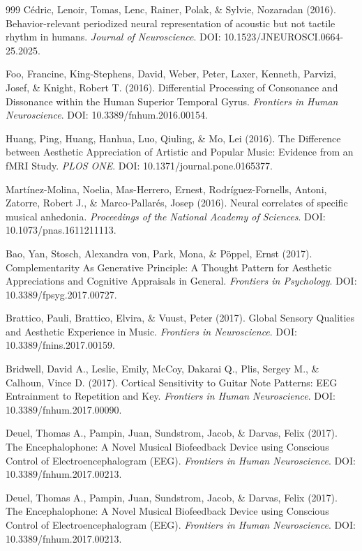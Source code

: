 \documentclass[9pt,onecolumn]{article}
\begin{document}
\begin{thebibliography}{999}
Cédric, Lenoir, Tomas, Lenc, Rainer, Polak, \& Sylvie, Nozaradan (2016). Behavior-relevant periodized neural representation of acoustic but not tactile rhythm in humans. \textit{Journal of Neuroscience}. DOI: 10.1523/JNEUROSCI.0664-25.2025.

Foo, Francine, King-Stephens, David, Weber, Peter, Laxer, Kenneth, Parvizi, Josef, \& Knight, Robert T. (2016). Differential Processing of Consonance and Dissonance within the Human Superior Temporal Gyrus. \textit{Frontiers in Human Neuroscience}. DOI: 10.3389/fnhum.2016.00154.

Huang, Ping, Huang, Hanhua, Luo, Qiuling, \& Mo, Lei (2016). The Difference between Aesthetic Appreciation of Artistic and Popular Music: Evidence from an fMRI Study. \textit{PLOS ONE}. DOI: 10.1371/journal.pone.0165377.

Martínez-Molina, Noelia, Mas-Herrero, Ernest, Rodríguez-Fornells, Antoni, Zatorre, Robert J., \& Marco-Pallarés, Josep (2016). Neural correlates of specific musical anhedonia. \textit{Proceedings of the National Academy of Sciences}. DOI: 10.1073/pnas.1611211113.

Bao, Yan, Stosch, Alexandra von, Park, Mona, \& Pöppel, Ernst (2017). Complementarity As Generative Principle: A Thought Pattern for Aesthetic Appreciations and Cognitive Appraisals in General. \textit{Frontiers in Psychology}. DOI: 10.3389/fpsyg.2017.00727.

Brattico, Pauli, Brattico, Elvira, \& Vuust, Peter (2017). Global Sensory Qualities and Aesthetic Experience in Music. \textit{Frontiers in Neuroscience}. DOI: 10.3389/fnins.2017.00159.

Bridwell, David A., Leslie, Emily, McCoy, Dakarai Q., Plis, Sergey M., \& Calhoun, Vince D. (2017). Cortical Sensitivity to Guitar Note Patterns: EEG Entrainment to Repetition and Key. \textit{Frontiers in Human Neuroscience}. DOI: 10.3389/fnhum.2017.00090.

Deuel, Thomas A., Pampin, Juan, Sundstrom, Jacob, \& Darvas, Felix (2017). The Encephalophone: A Novel Musical Biofeedback Device using Conscious Control of Electroencephalogram (EEG). \textit{Frontiers in Human Neuroscience}. DOI: 10.3389/fnhum.2017.00213.

Deuel, Thomas A., Pampin, Juan, Sundstrom, Jacob, \& Darvas, Felix (2017). The Encephalophone: A Novel Musical Biofeedback Device using Conscious Control of Electroencephalogram (EEG). \textit{Frontiers in Human Neuroscience}. DOI: 10.3389/fnhum.2017.00213.


\end{thebibliography}
\end{document}

